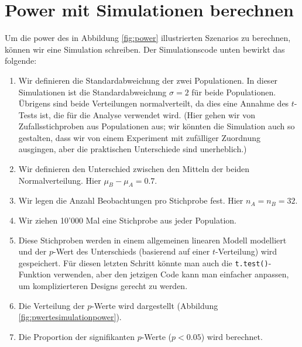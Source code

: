 \documentclass[oneside, 10pt]{book}\usepackage[]{graphicx}\usepackage[]{xcolor}
\begin{document}
\section{Power mit Simulationen berechnen}
Um die power des in Abbildung \ref{fig:power} illustrierten
Szenarios zu berechnen, können wir eine Simulation schreiben.
Der Simulationscode unten bewirkt das folgende:
\begin{enumerate}
 \item Wir definieren die Standardabweichung der zwei Populationen.
 In dieser Simulationen ist die Standardabweichung $\sigma = 2$ für beide Populationen.
 Übrigens sind beide Verteilungen normalverteilt, da dies eine Annahme
 des $t$-Tests ist, die für die Analyse verwendet wird.
 (Hier gehen wir von Zufallsstichproben aus Populationen aus;
 wir könnten die Simulation auch so gestalten, dass wir von einem Experiment
 mit zufälliger Zuordnung ausgingen, aber die praktischen Unterschiede sind unerheblich.)
 
 \item Wir definieren den Unterschied zwischen den Mitteln der beiden
 Normalverteilung. Hier $\mu_B - \mu_A = 0.7$.
 
 \item Wir legen die Anzahl Beobachtungen pro Stichprobe fest. Hier $n_A = n_B = 32$.
 
 \item Wir ziehen 10'000 Mal eine Stichprobe aus jeder Population.
 
 \item Diese Stichproben werden in einem allgemeinen linearen Modell modelliert
 und der $p$-Wert des Unterschieds (basierend auf einer $t$-Verteilung) wird gespeichert.
 Für diesen letzten Schritt könnte man auch die \texttt{t.test()}-Funktion
 verwenden, aber den jetzigen Code kann man einfacher anpassen, um komplizierteren
 Designs gerecht zu werden.
 
 \item Die Verteilung der $p$-Werte wird dargestellt (Abbildung \ref{fig:pwertesimulationpower}).
 
 \item Die Proportion der signifikanten $p$-Werte ($p < 0.05$) wird berechnet.
\end{enumerate}
\end{document}
